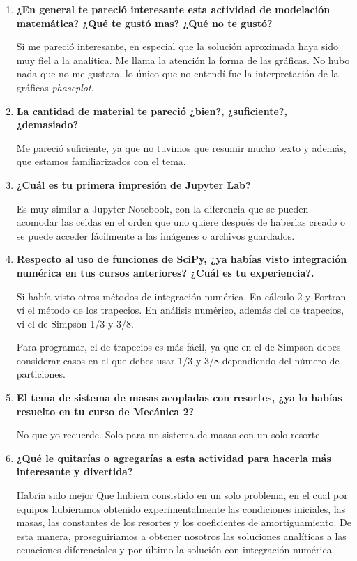 \documentclass[a4paper]{article}
\begin{document}
\begin{enumerate}
\item \textbf {¿En general te pareció interesante esta actividad de modelación matemática? ¿Qué te gustó mas? ¿Qué no te gustó?}


Si me pareció interesante, en especial que la solución aproximada haya sido muy fiel a la analítica. Me llama la atención la forma de las gráficas. No hubo nada que no me gustara, lo único que no entendí fue la interpretación de la gráficas \textit{phaseplot}.

\item \textbf {La cantidad de material te pareció ¿bien?, ¿suficiente?, ¿demasiado?}

Me pareció suficiente, ya que no tuvimos que resumir mucho texto y además, que estamos familiarizados con el tema. 

\item \textbf {¿Cuál es tu primera impresión de Jupyter Lab? }

Es muy similar a Jupyter Notebook, con la diferencia que se pueden acomodar las celdas en el orden que uno quiere después de haberlas creado o se puede acceder fácilmente a las imágenes o archivos guardados.

\item \textbf {Respecto al uso de funciones de SciPy, ¿ya habías visto integración numérica en tus cursos anteriores? ¿Cuál es tu experiencia?.}

Si había visto otros métodos de integración numérica. En cálculo 2 y Fortran ví el método de los trapecios. En análisis numérico, además del de trapecios, vi el de Simpson 1/3 y 3/8. 

Para programar, el de trapecios es más fácil, ya que en el de Simpson debes considerar casos en el que debes usar 1/3 y 3/8 dependiendo del número de particiones.


\item \textbf {El tema de sistema de masas acopladas con resortes, ¿ya lo habías resuelto en tu curso de Mecánica 2?  }

No que yo recuerde. Solo para un sistema de masas con un solo resorte. 


\item \textbf {¿Qué le quitarías o agregarías a esta actividad para hacerla más interesante y divertida?  }

Habría sido mejor Que hubiera consistido en un solo problema, en el cual por equipos hubieramos obtenido experimentalmente las condiciones iniciales, las masas, las constantes de los resortes y los coeficientes de amortiguamiento. De esta manera, proseguiriamos a obtener nosotros las soluciones analíticas a las ecuaciones diferenciales y por último la solución con integración numérica. 


\end{enumerate}
\end{document}
